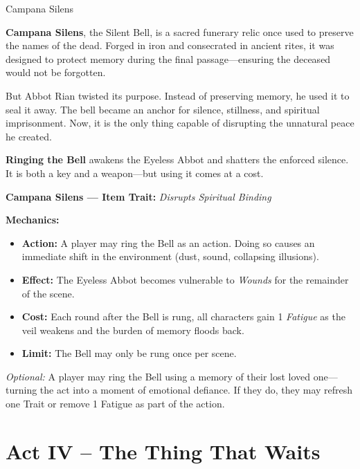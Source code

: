\documentclass[nodeprecatedcode,bg=print]{dndbook/dndbook}
\begin{document}
\begin{WyrdSidebar}{Campana Silens}

    \textbf{Campana Silens}, the Silent Bell, is a sacred funerary relic once used to preserve the names of the dead. Forged in iron and consecrated in ancient rites, it was designed to protect memory during the final passage—ensuring the deceased would not be forgotten.
    
    But Abbot Rian twisted its purpose. Instead of preserving memory, he used it to seal it away. The bell became an anchor for silence, stillness, and spiritual imprisonment. Now, it is the only thing capable of disrupting the unnatural peace he created.
    
    \textbf{Ringing the Bell} awakens the Eyeless Abbot and shatters the enforced silence. It is both a key and a weapon—but using it comes at a cost.
    
    \vspace{0.5\baselineskip}
    \textbf{Campana Silens — Item Trait:} \emph{Disrupts Spiritual Binding}
    
    \vspace{0.5\baselineskip}
    \textbf{Mechanics:}
    \begin{itemize}
        \item \textbf{Action:} A player may ring the Bell as an action. Doing so causes an immediate shift in the environment (dust, sound, collapsing illusions).
        \item \textbf{Effect:} The Eyeless Abbot becomes vulnerable to \emph{Wounds} for the remainder of the scene.
        \item \textbf{Cost:} Each round after the Bell is rung, all characters gain 1 \emph{Fatigue} as the veil weakens and the burden of memory floods back.
        \item \textbf{Limit:} The Bell may only be rung once per scene.
    \end{itemize}
    
    \emph{Optional:} A player may ring the Bell using a memory of their lost loved one—turning the act into a moment of emotional defiance. If they do, they may refresh one Trait or remove 1 Fatigue as part of the action.
    
\end{WyrdSidebar}

    
\section*{Act IV – The Thing That Waits}
\end{document}
